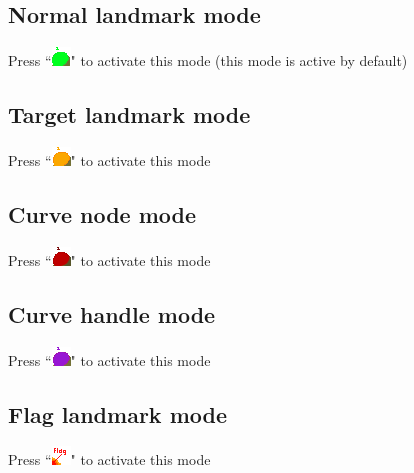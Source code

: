 \subsection{Normal landmark mode}	
Press ``\includegraphics[scale=0.7]{images/04/normal_landmarks.png}" to activate this mode (this mode is active by default)

\subsection{Target landmark mode}	
Press ``\includegraphics[scale=0.7]{images/04/target_landmarks.png}"  to activate this mode

\subsection{Curve node mode}	
Press ``\includegraphics[scale=0.7]{images/04/curve_nodes.png}" to activate this mode 

\subsection{Curve handle mode}	
Press ``\includegraphics[scale=0.7]{images/04/curve_handles.png}"  to activate this mode


\subsection{Flag landmark mode}	
Press ``\includegraphics[scale=0.7]{images/04/flag_landmarks.png}" to activate this mode

